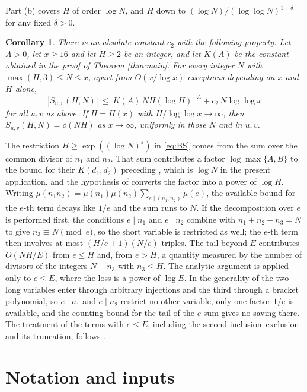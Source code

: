 \documentclass[11pt,a4paper]{article}
\theoremstyle{plain}
\newtheorem{corollary}[theorem]{Corollary}
\theoremstyle{remark}
\newcommand{\eps}{\varepsilon}
\newcommand{\Suv}{S_{u,v}}
\begin{document}
Part (b) covers $H$ of order $\log N$, and $H$ down to $(\log N)/(\log\log N)^{1-\delta}$ for any
fixed $\delta>0$.

\begin{corollary}\label{cor:aa}
There is an absolute constant $c_2$ with the following property. Let $A>0$, let $x\ge16$ and let
$H\ge2$ be an integer, and let $K(A)$ be the constant obtained in the proof of
Theorem \ref{thm:main}. For every integer $N$ with $\max(H,3)\le N\le x$, apart from $O(x/\log x)$
exceptions depending on $x$ and $H$ alone,
\begin{equation}\label{eq:aa}
  |\Suv(H,N)|\ \le\ K(A)\,NH(\log H)^{-A}+c_2\,N\log\log x
\end{equation}
for all $u,v$ as above. If $H=H(x)$ with $H/\log\log x\to\infty$, then $\Suv(H,N)=o(NH)$ as
$x\to\infty$, uniformly in those $N$ and in $u,v$.
\end{corollary}

The restriction $H\ge\exp((\log N)^{\eps})$ in \eqref{eq:BS} comes from the sum over the common
divisor of $n_1$ and $n_2$. That sum contributes a factor $\log\max\{A,B\}$ to the bound for their
$K(d_1,d_2)$ preceding \cite[(4.6)]{BS}, which is $\log N$ in the present application, and the
hypothesis of \cite[Thm.~2.1]{BS} converts the factor into a power of $\log H$. Writing
$\mu(n_1n_2)=\mu(n_1)\mu(n_2)\sum_{e\mid(n_1,n_2)}\mu(e)$, the available bound for the $e$-th term
decays like $1/e$ and the sum runs to $N$. If the decomposition over $e$ is performed first, the
conditions $e\mid n_1$ and $e\mid n_2$ combine with $n_1+n_2+n_3=N$ to give $n_3\equiv N\pmod e$, so
the short variable is restricted as well; the $e$-th term then involves at most $(H/e+1)(N/e)$
triples. The tail beyond $E$ contributes $O(NH/E)$ from $e\le H$ and, from $e>H$, a quantity measured
by the number of divisors of the integers $N-n_3$ with $n_3\le H$. The analytic argument is applied
only to $e\le E$, where the loss is a power of $\log E$. In the generality of \cite[Thm.~2.1]{BS} the
two long variables enter through arbitrary injections and the third through a bracket polynomial, so
$e\mid n_1$ and $e\mid n_2$ restrict no other variable, only one factor $1/e$ is available, and the
counting bound for the tail of the $e$-sum gives no saving there. The treatment of the
terms with $e\le E$, including the second inclusion--exclusion and its truncation, follows
\cite[\S4]{BS}.

\section{Notation and inputs}\label{sec:notation}
\end{document}
